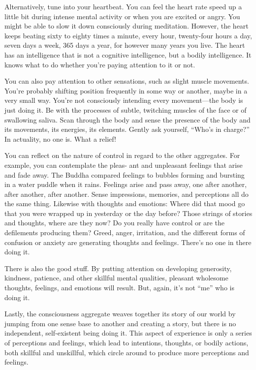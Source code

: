 Alternatively, tune into your heartbeat. You can feel the heart rate speed up a little bit during intense mental activity or when you are excited or angry. You might be able to slow it down consciously during meditation. However, the heart keeps beating sixty to eighty times a minute, every hour, twenty-four hours a day, seven days a week, 365 days a year, for however many years you live. The heart has \linebreak an intelligence that is not a cognitive intelligence, but a bodily intelligence. It knows what to do whether you're paying attention to it or not.

You can also pay attention to other sensations, such as slight muscle movements. You're probably shifting position frequently in some way or another, maybe in a very small way. You're not consciously intending every movement---the body is just doing it. Be with the processes of subtle, twitching muscles of the face or of swallowing saliva. Scan through the body and sense the presence of the body and its movements, its energies, its elements. Gently ask yourself, ``Who's in charge?'' In actuality, no one is. What a relief!{\parfillskip=0pt \par}

You can reflect on the nature of control in regard to the other aggregates. For example, you can contemplate the pleas- \linebreak ant and unpleasant feelings that arise and fade away. The Buddha compared feelings to bubbles forming and bursting in a water puddle when it rains. Feelings arise and pass away, one after another, after another, after another. Sense impressions, memories, and perceptions all do the same thing. Likewise with thoughts and emotions: Where did that mood go that you were wrapped up in yesterday or the day before? Those strings of stories and thoughts, where are they now? Do you really have control or are the defilements producing them? Greed, anger, irritation, and the different forms of confusion or anxiety are generating thoughts and feelings. There's no one in there doing it.

There is also the good stuff. By putting attention on developing generosity, kindness, patience, and other skillful mental qualities, pleasant wholesome thoughts, feelings, and emotions will result. But, again, it's not ``me'' who is doing it.

Lastly, the consciousness aggregate weaves together its story of our world by jumping from one sense base to another and creating a story, but there is no independent, self-existent being doing it. This aspect of experience is only a series of perceptions and feelings, which lead to intentions, thoughts, or bodily actions, both skillful and unskillful, which circle around to produce more perceptions and feelings.

